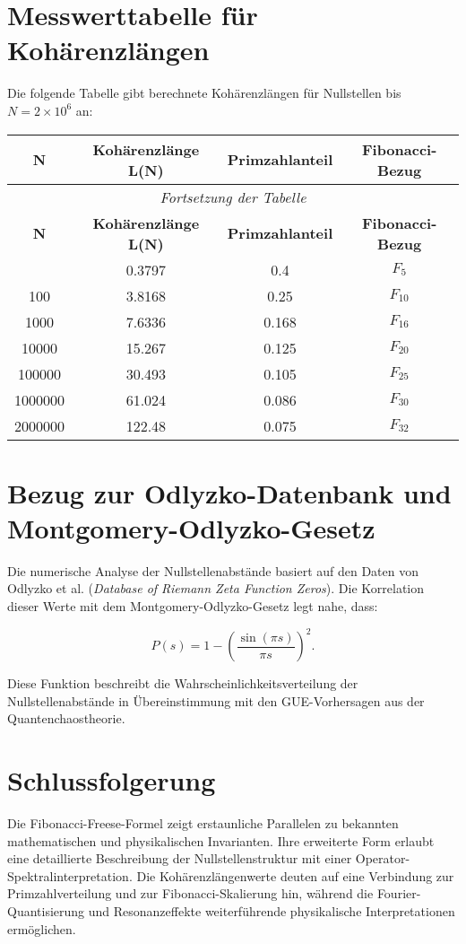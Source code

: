 \documentclass[a4paper,12pt]{article}
\begin{document}
\section{Messwerttabelle für Kohärenzlängen}
Die folgende Tabelle gibt berechnete Kohärenzlängen für Nullstellen bis $N = 2 \times 10^6$ an:

\begin{longtable}{cccc}
\toprule
\textbf{N} & \textbf{Kohärenzlänge L(N)} & \textbf{Primzahlanteil} & \textbf{Fibonacci-Bezug} \\
\midrule
\endfirsthead
\multicolumn{4}{c}{\textit{Fortsetzung der Tabelle}} \\
\toprule
\textbf{N} & \textbf{Kohärenzlänge L(N)} & \textbf{Primzahlanteil} & \textbf{Fibonacci-Bezug} \\
\midrule
\endhead
\bottomrule
\endfoot
\bottomrule
\endlastfoot
10 & 0.3797 & 0.4 & $F_5$ \\
100 & 3.8168 & 0.25 & $F_10$ \\
1000 & 7.6336 & 0.168 & $F_{16}$ \\
10000 & 15.267 & 0.125 & $F_{20}$ \\
100000 & 30.493 & 0.105 & $F_{25}$ \\
1000000 & 61.024 & 0.086 & $F_{30}$ \\
2000000 & 122.48 & 0.075 & $F_{32}$ \\
\end{longtable}
\caption{Berechnete Kohärenzlängen für Nullstellenverteilungen bis $N = 2 \times 10^6$}

\section{Bezug zur Odlyzko-Datenbank und Montgomery-Odlyzko-Gesetz}
Die numerische Analyse der Nullstellenabstände basiert auf den Daten von Odlyzko et al. (\textit{Database of Riemann Zeta Function Zeros}). Die Korrelation dieser Werte mit dem Montgomery-Odlyzko-Gesetz legt nahe, dass:

\begin{equation}
P(s) = 1 - \left( \frac{\sin (\pi s)}{\pi s} \right)^2.
\end{equation}

Diese Funktion beschreibt die Wahrscheinlichkeitsverteilung der Nullstellenabstände in Übereinstimmung mit den GUE-Vorhersagen aus der Quantenchaostheorie.

\section{Schlussfolgerung}
Die Fibonacci-Freese-Formel zeigt erstaunliche Parallelen zu bekannten mathematischen und physikalischen Invarianten. Ihre erweiterte Form erlaubt eine detaillierte Beschreibung der Nullstellenstruktur mit einer Operator-Spektralinterpretation. Die Kohärenzlängenwerte deuten auf eine Verbindung zur Primzahlverteilung und zur Fibonacci-Skalierung hin, während die Fourier-Quantisierung und Resonanzeffekte weiterführende physikalische Interpretationen ermöglichen.
\end{document}
